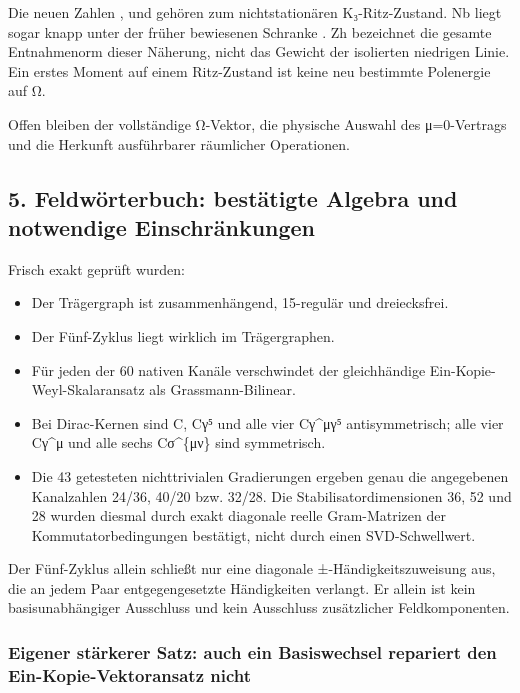 Die neuen Zahlen ,  und
 gehören zum nichtstationären K₃-Ritz-Zustand.
Nb liegt sogar knapp unter der früher bewiesenen Schranke
. Zh bezeichnet die gesamte Entnahmenorm dieser
Näherung, nicht das Gewicht der isolierten niedrigen Linie. Ein erstes
Moment auf einem Ritz-Zustand ist keine neu bestimmte Polenergie auf Ω.

Offen bleiben der vollständige Ω-Vektor, die physische Auswahl des
μ=0-Vertrags und die Herkunft ausführbarer räumlicher Operationen.

\subsection{5. Feldwörterbuch: bestätigte Algebra und notwendige
Einschränkungen}\label{feldwuxf6rterbuch-bestuxe4tigte-algebra-und-notwendige-einschruxe4nkungen}

Frisch exakt geprüft wurden:

\begin{itemize}
\tightlist
\item
  Der Trägergraph ist zusammenhängend, 15-regulär und dreiecksfrei.
\item
  Der Fünf-Zyklus  liegt wirklich im
  Trägergraphen.
\item
  Für jeden der 60 nativen Kanäle verschwindet der gleichhändige
  Ein-Kopie-Weyl-Skalaransatz  als Grassmann-Bilinear.
\item
  Bei Dirac-Kernen sind C, Cγ⁵ und alle vier Cγ\^{}μγ⁵ antisymmetrisch;
  alle vier Cγ\^{}μ und alle sechs Cσ\^{}\{μν\} sind symmetrisch.
\item
  Die 43 getesteten nichttrivialen Gradierungen ergeben genau die
  angegebenen Kanalzahlen 24/36, 40/20 bzw. 32/28. Die
  Stabilisatordimensionen 36, 52 und 28 wurden diesmal durch exakt
  diagonale reelle Gram-Matrizen der Kommutatorbedingungen bestätigt,
  nicht durch einen SVD-Schwellwert.
\end{itemize}

Der Fünf-Zyklus allein schließt nur eine diagonale
±-Händigkeitszuweisung aus, die an jedem Paar entgegengesetzte
Händigkeiten verlangt. Er allein ist kein basisunabhängiger Ausschluss
und kein Ausschluss zusätzlicher Feldkomponenten.

\subsubsection{Eigener stärkerer Satz: auch ein Basiswechsel repariert
den Ein-Kopie-Vektoransatz
nicht}\label{eigener-stuxe4rkerer-satz-auch-ein-basiswechsel-repariert-den-ein-kopie-vektoransatz-nicht}

